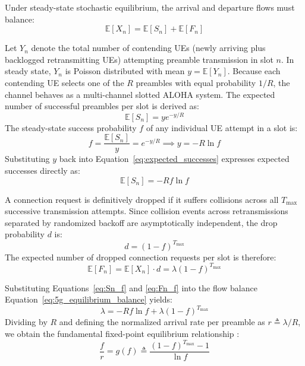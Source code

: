 Under steady-state stochastic equilibrium, the arrival and departure flows must balance:
\begin{equation}
    \label{eq:5g_equilibrium_balance}
    \mathbb{E}[X_n] = \mathbb{E}[S_n] + \mathbb{E}[F_n]
\end{equation}

Let $Y_n$ denote the total number of contending UEs (newly arriving plus backlogged retransmitting UEs) attempting preamble transmission in slot $n$. In steady state, $Y_n$ is Poisson distributed with mean $y = \mathbb{E}[Y_n]$. Because each contending UE selects one of the $R$ preambles with equal probability $1/R$, the channel behaves as a multi-channel slotted ALOHA system. The expected number of successful preambles per slot is derived as:
\begin{equation}
    \label{eq:expected_successes}
    \mathbb{E}[S_n] = y e^{-y/R}
\end{equation}
The steady-state success probability $f$ of any individual UE attempt in a slot is:
\begin{equation}
    \label{eq:f_def}
    f = \frac{\mathbb{E}[S_n]}{y} = e^{-y/R} \implies y = -R \ln f
\end{equation}
Substituting $y$ back into Equation~\eqref{eq:expected_successes} expresses expected successes directly as:
\begin{equation}
    \label{eq:Sn_f}
    \mathbb{E}[S_n] = -R f \ln f
\end{equation}

A connection request is definitively dropped if it suffers collisions across all $T_{\max}$ successive transmission attempts. Since collision events across retransmissions separated by randomized backoff are asymptotically independent, the drop probability $d$ is:
\begin{equation}
    \label{eq:drop_prob}
    d = (1 - f)^{T_{\max}}
\end{equation}
The expected number of dropped connection requests per slot is therefore:
\begin{equation}
    \label{eq:Fn_f}
    \mathbb{E}[F_n] = \mathbb{E}[X_n] \cdot d = \lambda (1 - f)^{T_{\max}}
\end{equation}

Substituting Equations~\eqref{eq:Sn_f} and \eqref{eq:Fn_f} into the flow balance Equation~\eqref{eq:5g_equilibrium_balance} yields:
\begin{equation}
    \lambda = -R f \ln f + \lambda (1 - f)^{T_{\max}}
\end{equation}
Dividing by $R$ and defining the normalized arrival rate per preamble as $r \triangleq \lambda / R$, we obtain the fundamental fixed-point equilibrium relationship \cite{bommisetty2023connection}:
\begin{equation}
    \label{eq:fixed_point_master}
    \frac{f}{r} = g(f) \triangleq \frac{(1 - f)^{T_{\max}} - 1}{\ln f}
\end{equation}

